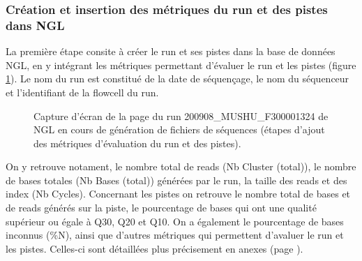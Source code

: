 \subsubsection{Création et insertion des métriques du run et des pistes dans NGL }
La première étape consite à créer le run et ses pistes dans la base de données NGL, en y intégrant les métriques permettant d'évaluer le run et les pistes (figure \ref{NGL-screenshot_run-lane}).
Le nom du run est constitué de la date de séquençage, le nom du séquenceur et l'identifiant de la flowcell du run.

\begin{figure}[H]
    \centering
    \caption{\footnotesize{Capture d'écran de la page du run 200908\_MUSHU\_F300001324 de NGL en cours de génération de fichiers de séquences (étapes d'ajout des métriques d'évaluation du run et des pistes).}}
    \label{NGL-screenshot_run-lane}
\end{figure}

On y retrouve notament, le nombre total de reads (Nb Cluster (total)), le nombre de bases totales (Nb Bases (total)) générées par le run, la taille des reads et des index (Nb Cycles).
Concernant les pistes on retrouve le nombre total de bases et de reads générés sur la piste, le pourcentage de bases qui ont une qualité supérieur ou égale à Q30, Q20 et Q10. On a également le pourcentage de bases inconnus (\%N), ainsi que d'autres métriques qui permettent d'avaluer le run et les pistes. Celles-ci sont détaillées plus précisement en anexes (page \pageref{anexes1}).\\

